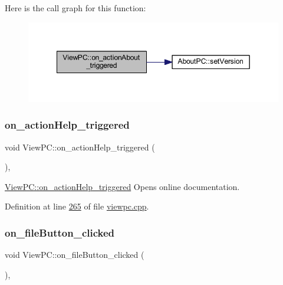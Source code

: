Here is the call graph for this function\+:
\nopagebreak
\begin{figure}[H]
\begin{center}
\leavevmode
\includegraphics[width=349pt]{class_view_p_c_a09a46da4d492eb3dde88f35dc58c997b_cgraph}
\end{center}
\end{figure}
\mbox{\label{class_view_p_c_a0d252ff4829260c6c76769fbd24b7cd7}} 
\subsubsection{\texorpdfstring{on\+\_\+action\+Help\+\_\+triggered}{on\_actionHelp\_triggered}}
{\footnotesize\ttfamily void View\+P\+C\+::on\+\_\+action\+Help\+\_\+triggered (\begin{DoxyParamCaption}{ }\end{DoxyParamCaption})\hspace{0.3cm}{\ttfamily [protected]}, {\ttfamily [slot]}}



\mbox{\hyperlink{class_view_p_c_a0d252ff4829260c6c76769fbd24b7cd7}{View\+P\+C\+::on\+\_\+action\+Help\+\_\+triggered}} Opens online documentation. 



Definition at line \mbox{\hyperlink{viewpc_8cpp_source_l00265}{265}} of file \mbox{\hyperlink{viewpc_8cpp_source}{viewpc.\+cpp}}.

\mbox{\label{class_view_p_c_a3b9b7a7be9702d8b160f257f1c74a776}} 
\subsubsection{\texorpdfstring{on\+\_\+file\+Button\+\_\+clicked}{on\_fileButton\_clicked}}
{\footnotesize\ttfamily void View\+P\+C\+::on\+\_\+file\+Button\+\_\+clicked (\begin{DoxyParamCaption}{ }\end{DoxyParamCaption})\hspace{0.3cm}{\ttfamily [protected]}, {\ttfamily [slot]}}



